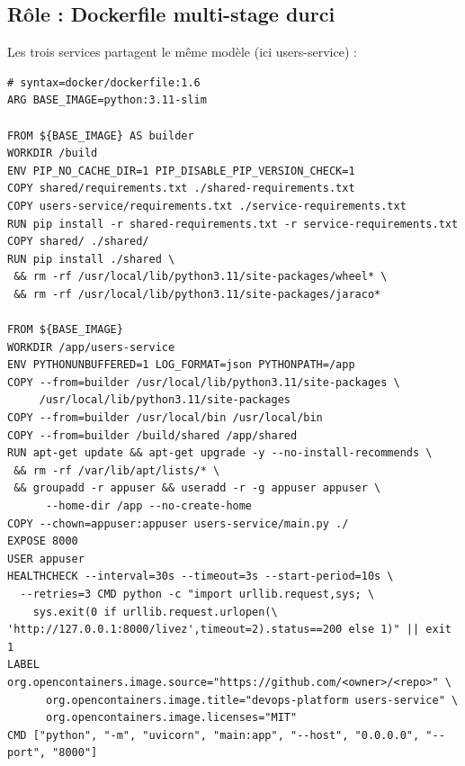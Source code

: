 \documentclass[12pt,a4paper,twoside,openright]{report}
\begin{document}
\subsection{Rôle : Dockerfile multi-stage durci}
Les trois services partagent le même modèle (ici users-service) :

\begin{lstlisting}[caption={app/users-service/Dockerfile : complet}]
# syntax=docker/dockerfile:1.6
ARG BASE_IMAGE=python:3.11-slim

FROM ${BASE_IMAGE} AS builder
WORKDIR /build
ENV PIP_NO_CACHE_DIR=1 PIP_DISABLE_PIP_VERSION_CHECK=1
COPY shared/requirements.txt ./shared-requirements.txt
COPY users-service/requirements.txt ./service-requirements.txt
RUN pip install -r shared-requirements.txt -r service-requirements.txt
COPY shared/ ./shared/
RUN pip install ./shared \
 && rm -rf /usr/local/lib/python3.11/site-packages/wheel* \
 && rm -rf /usr/local/lib/python3.11/site-packages/jaraco*

FROM ${BASE_IMAGE}
WORKDIR /app/users-service
ENV PYTHONUNBUFFERED=1 LOG_FORMAT=json PYTHONPATH=/app
COPY --from=builder /usr/local/lib/python3.11/site-packages \
     /usr/local/lib/python3.11/site-packages
COPY --from=builder /usr/local/bin /usr/local/bin
COPY --from=builder /build/shared /app/shared
RUN apt-get update && apt-get upgrade -y --no-install-recommends \
 && rm -rf /var/lib/apt/lists/* \
 && groupadd -r appuser && useradd -r -g appuser appuser \
      --home-dir /app --no-create-home
COPY --chown=appuser:appuser users-service/main.py ./
EXPOSE 8000
USER appuser
HEALTHCHECK --interval=30s --timeout=3s --start-period=10s \
  --retries=3 CMD python -c "import urllib.request,sys; \
    sys.exit(0 if urllib.request.urlopen(\
'http://127.0.0.1:8000/livez',timeout=2).status==200 else 1)" || exit 1
LABEL org.opencontainers.image.source="https://github.com/<owner>/<repo>" \
      org.opencontainers.image.title="devops-platform users-service" \
      org.opencontainers.image.licenses="MIT"
CMD ["python", "-m", "uvicorn", "main:app", "--host", "0.0.0.0", "--port", "8000"]
\end{lstlisting}
\end{document}
